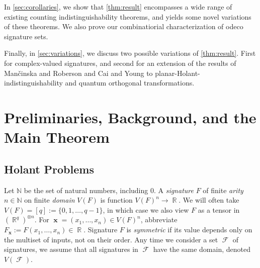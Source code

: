 \documentclass{article}
\theoremstyle{remark}
\theoremstyle{definition}
\DeclareMathOperator{\rr}{\mathbb{R}}
\DeclareMathOperator{\vx}{\mathbf{x}}
\DeclareMathOperator{\fc}{\mathcal{F}}
\begin{document}
In \autoref{sec:corollaries}, we show that \autoref{thm:result} 
encompasses a wide range of existing counting indistinguishability theorems,
and yields some novel variations of these theorems. We also prove our combinatiorial characterization of
odeco signature sets.

Finally, in \autoref{sec:variations}, we discuss two possible variations of \autoref{thm:result}.
First for complex-valued signatures, and second for an extension of the results 
of Man\v{c}inska and Roberson \cite{planar} and Cai and Young \cite{cai_planar_2023} 
to planar-Holant-indistinguishability and quantum orthogonal transformations.
 \section{Preliminaries, Background, and the Main Theorem}
\label{sec:preliminaries}
\subsection{Holant Problems}
\label{sec:holant}
Let $\mathbb{N}$ be the set of natural numbers, including 0.
A \emph{signature} $F$ of finite \emph{arity} $n \in \mathbb{N}$ on finite \emph{domain} $V(F)$ is function $V(F)^n \to \rr$.
We will often take $V(F) = [q] := \{0,1,\ldots,q-1\}$, in which case we also view $F$ as a
tensor in $(\rr^q)^{\otimes n}$. For $\vx = (x_1,\ldots,x_n) \in V(F)^n$, abbreviate
$F_{\vx} := F(x_1,\ldots,x_n) \in \rr$. Signature $F$ is \emph{symmetric} if 
its value depends only on the multiset of inputs, not on their order.
Any time we consider a set $\fc$ of signatures,
we assume that all signatures in $\fc$ have the same domain, denoted $V(\fc)$. 
\end{document}
